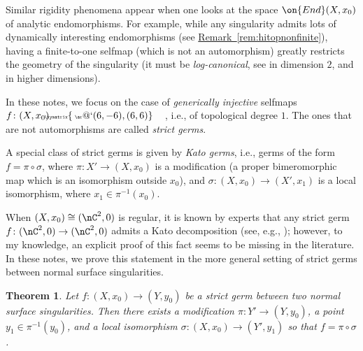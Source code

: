 \documentclass[11 pt, twoside, a4paper]{amsart}
\makeatletter
\newcommand{\Kpi}{{\pi}} %
\newcommand{\Ksigma}{{\sigma}} %
\newcommand{\selfarrow}[1][]{\tiny{\!\!\!\xymatrix{\phantom{|}\ar@`{(6,-6),(6,6)}}\hspace{4mm}}}
\newtheorem{introthm}{Theorem}
\theoremstyle{definition}
\theoremstyle{definition}
\newcommand{\refrem}[1]{\hyperref[rem:#1]{Remark~\ref*{rem:#1}}}
\makeatother
\begin{document}

Similar rigidity phenomena appear when one looks at the space $\on{End}(X,x_0)$ of analytic endomorphisms.
For example, while any singularity admits lots of dynamically interesting endomorphisms (see \refrem{hitopnonfinite}), having a finite-to-one selfmap (which is not an automorphism) greatly restricts the geometry of the singularity (it must be \emph{log-canonical}, see \cite{wahl:charnumlinksurfsing, favre:holoselfmapssingratsurf} in dimension $2$, and \cite{boucksom-defernex-favre:volumeisolatedsing, broustet-horing:singendo, zhang:isolatedsingnoninvfiniteendo} in higher dimensions).

In these notes, we focus on the case of \emph{generically injective} selfmaps $f \colon (X,x_0) \selfarrow$, i.e., of topological degree $1$. The ones that are not automorphisms are called \emph{strict germs}.

A special class of strict germs is given by \emph{Kato germs}, i.e., germs of the form $f=\Kpi \circ \Ksigma$, where $\Kpi \colon X' \to (X,x_0)$ is a modification (a proper bimeromorphic map which is an isomorphism outside $x_0$), and $\Ksigma \colon (X,x_0) \to (X',x_1)$ is a local isomorphism, where $x_1 \in \Kpi^{-1}(x_0)$.

When $(X,x_0) \cong (\nC^2,0)$ is regular, it is known by experts that any strict germ $f \colon (\nC^2,0) \to (\nC^2,0)$ admits a Kato decomposition (see, e.g., \cite[Proposition 0.5]{favre:rigidgerms}); however, to my knowledge, an explicit proof of this fact seems to be missing in the literature.
In these notes, we prove this statement in the more general setting of strict germs between normal surface singularities.

\begin{introthm}\label{thm:strictkato}
Let $f\colon (X,x_0) \to (Y,y_0)$ be a strict germ between two normal surface singularities.
Then there exists a modification $\Kpi\colon Y' \to (Y,y_0)$, a point $y_1 \in \Kpi^{-1}(y_0)$, and a local isomorphism $\Ksigma \colon (X,x_0) \to (Y',y_1)$ so that $f=\Kpi \circ \Ksigma$.
\end{introthm}
\end{document}
